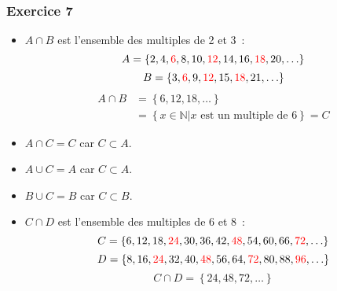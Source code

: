 \documentclass[10pt,notheorems]{beamer}
\newcommand{\red}{\color{red}}
\theoremstyle{plain}
\theoremstyle{definition} %
\begin{document}
\begin{frame}
  \frametitle{Exercice 7}
  \fontsize{8}{10}\selectfont

  \begin{itemize}

  \item $A\cap B$ est l'ensemble des multiples de 2 et 3~:
    \[
      A = \left\{2, 4, {\red 6}, 8, 10, {\red 12}, 14, 16, {\red 18}, 20, \ldots\right\}
    \]
    \[
      B = \left\{3, {\red 6}, 9, {\red 12}, 15, {\red 18}, 21, \ldots\right\}
    \]
    \[
      \begin{split}
        A\cap B &= \left\{6, 12, 18, \ldots\right\}\\
        &= \left\{x\in\mathbb N | x\text{ est un multiple de 6}\right\} = C
      \end{split}
    \]

  \item $A \cap C = C$ car $C \subset A$.\newline

  \item $A \cup C = A$ car $C \subset A$.\newline

  \item $B \cup C = B$ car $C \subset B$.\newline

  \item $C \cap D$  est l'ensemble des multiples de 6 et 8 :
    \[
      C = \left\{6, 12, 18, {\red 24}, 30, 36, 42, {\red 48}, 54, 60, 66, {\red 72}, \ldots\right\}
    \]
    \[
      D = \left\{8, 16, {\red 24}, 32, 40, {\red 48}, 56, 64, {\red 72}, 80, 88, {\red 96}, \ldots\right\}
    \]
    \[
      C\cap D = \left\{24, 48, 72, \ldots\right\}
    \]
     
  \end{itemize}
  
\end{frame}
\end{document}
